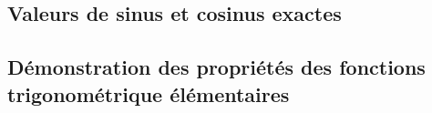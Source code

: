 \documentclass[a4paper]{article}
\begin{document}
		\subsection*{Valeurs de sinus et cosinus exactes} \label{valeur_remarquable_trigo}

		\subsection*{Démonstration des propriétés des fonctions trigonométrique élémentaires} \label{demo_propriete_trigo_1}
\end{document}

